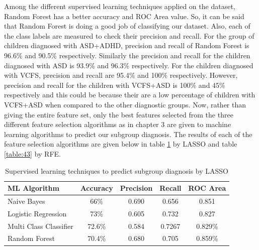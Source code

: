 Among the different supervised learning techniques applied on the dataset, Random Forest has a better accuracy and ROC Area value. So, it can be said that Random Forest is doing a good job of classifying our dataset. Also, each of the class labels are measured to check their precision and recall. For the group of children diagnosed with ASD+ADHD, precision and recall of Random Forest is 96.6\% and 90.5\% respectively. Similarly the precision and recall for the children diagnosed with ASD is 93.9\% and 96.3\% respectively. For the children diagnosed with VCFS, precision and recall are 95.4\% and 100\% respectively. However, precision and recall for the children with VCFS+ASD is 100\% and 45\% respectively and this could be because their are a low percentage of children with VCFS+ASD when compared to the other diagnostic groups.   Now, rather than giving the entire feature set, only the best features selected from the three different feature selection algorithms as in chapter 3 are given to machine learning algorithms to predict our subgroup diagnosis. The results of each of the feature selection algorithms are given below in table \ref{table:42} by LASSO and table \ref{table:43} by RFE.
\begin{table}[h]
\begin{center}
\begin{tabular}{|l|c|c|c|c|}
\hline
\textbf{ML Algorithm} & \textbf{Accuracy}&	\textbf{Precision}&	\textbf{Recall}&	\textbf{ROC Area}\\
\hline \hline
Naive Bayes&	66\%	&0.690&	0.656&	0.851\\
\hline
Logistic Regression&	73\%&	0.605&	0.732&	0.827\\
\hline
Multi Class Classifier&	72.6\%	&0.584	&0.7267&	0.829\%\\
\hline
Random Forest&	70.4\%&	0.680&	0.705	&0.859\%\\
\hline
\end{tabular}
\end{center}
\caption{Supervised learning techniques to predict subgroup diagnosis by LASSO}
\label{table:42}
\end{table}

